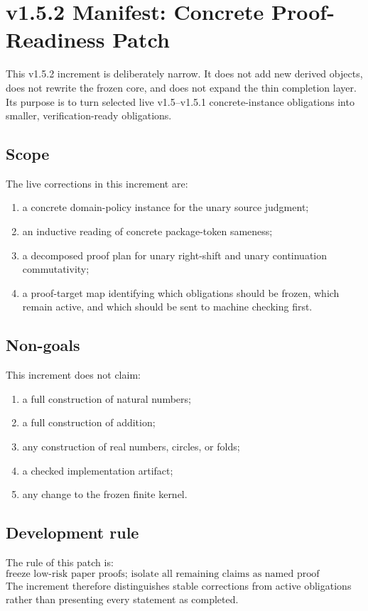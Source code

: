 
\chapter{v1.5.2 Manifest: Concrete Proof-Readiness Patch}
\label{ch:v152-manifest}

This v1.5.2 increment is deliberately narrow. It does not add new derived objects, does not rewrite the frozen core, and does not expand the thin completion layer. Its purpose is to turn selected live v1.5--v1.5.1 concrete-instance obligations into smaller, verification-ready obligations.

\section{Scope}
The live corrections in this increment are:
\begin{enumerate}
  \item a concrete domain-policy instance for the unary source judgment;
  \item an inductive reading of concrete package-token sameness;
  \item a decomposed proof plan for unary right-shift and unary continuation commutativity;
  \item a proof-target map identifying which obligations should be frozen, which remain active, and which should be sent to machine checking first.
\end{enumerate}

\section{Non-goals}
This increment does not claim:
\begin{enumerate}
  \item a full construction of natural numbers;
  \item a full construction of addition;
  \item any construction of real numbers, circles, or folds;
  \item a checked implementation artifact;
  \item any change to the frozen finite kernel.
\end{enumerate}

\section{Development rule}
The rule of this patch is:
\[
  \text{freeze low-risk paper proofs; isolate all remaining claims as named proof obligations.}
\]
The increment therefore distinguishes stable corrections from active obligations rather than presenting every statement as completed.

